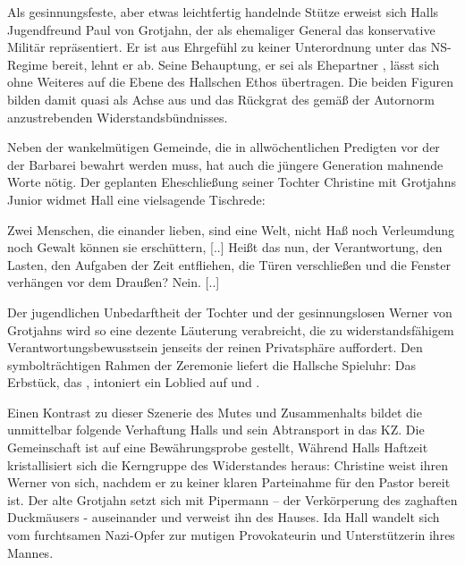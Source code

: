 Als gesinnungsfeste, aber etwas leichtfertig handelnde Stütze erweist sich Halls
Jugendfreund Paul von Grotjahn, der als ehemaliger General das konservative
Militär repräsentiert. Er ist aus Ehrgefühl zu keiner Unterordnung unter das
NS-Regime bereit, \Cite{Gehorchen und Maulhalten} lehnt er
ab.  
Seine Behauptung, er sei als Ehepartner \Cite{ein Ausbund von Treue}
, lässt sich ohne Weiteres auf die Ebene des Hallschen
Ethos übertragen. Die beiden Figuren bilden damit quasi als Achse aus
 und  das Rückgrat des
gemäß der Autornorm anzustrebenden Widerstandsbündnisses.

Neben der wankelmütigen Gemeinde, die in allwöchentlichen Predigten vor der
\Cite{Wüste} der Barbarei bewahrt werden muss, hat auch die jüngere Generation
mahnende Worte nötig. Der geplanten Eheschließung seiner Tochter Christine
mit Grotjahns Junior widmet Hall eine vielsagende Tischrede:

\begin{BlockQuote}
  Zwei Menschen, die einander lieben, sind eine Welt, nicht Haß noch Verleumdung
  noch Gewalt können sie erschüttern, [..] Heißt das nun, der Verantwortung, den
  Lasten, den Aufgaben der Zeit entfliehen, die Türen verschließen und die
  Fenster verhängen vor dem Draußen? Nein. [..] 
\end{BlockQuote}
Der jugendlichen Unbedarftheit der Tochter und der gesinnungslosen
\Cite{Objektivität}  Werner von Grotjahns wird so eine
dezente Läuterung verabreicht, die zu widerstandsfähigem
Verantwortungsbewusstsein jenseits der reinen Privatsphäre auffordert.  
Den symbolträchtigen Rahmen der Zeremonie liefert die Hallsche Spieluhr: Das
Erbstück, das \Cite{schon so alt [ist], daß sie spielt, wenn sie will},
intoniert ein Loblied auf \Cite{den kühnen Mute} und \Cite{den Zorn der freien
  Rede} .

Einen Kontrast zu dieser Szenerie des Mutes und Zusammenhalts bildet die
unmittelbar folgende Verhaftung Halls und sein Abtransport in das KZ. 
Die Gemeinschaft ist auf eine Bewährungsprobe gestellt, Während Halls
Haftzeit kristallisiert
sich die Kerngruppe des Widerstandes heraus: Christine weist ihren Werner
von sich, nachdem er zu keiner klaren Parteinahme für den Pastor bereit ist.
Der alte Grotjahn setzt sich mit Pipermann -- der Verkörperung des zaghaften
Duckmäusers - auseinander und verweist ihn des Hauses. 
Ida Hall wandelt sich vom furchtsamen Nazi-Opfer zur mutigen Provokateurin und
Unterstützerin ihres Mannes.

